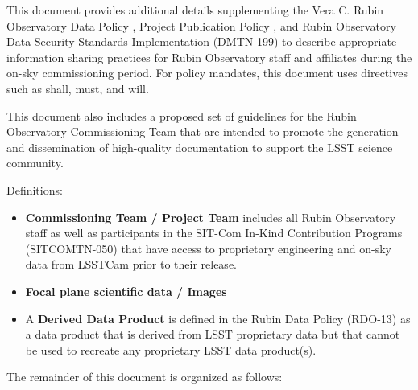 \documentclass[SE,authoryear,toc,lsstdraft]{lsstdoc}
\begin{document}
This document provides additional details supplementing the Vera C. Rubin Observatory Data Policy , Project Publication Policy , and Rubin Observatory Data Security Standards Implementation (DMTN-199) to describe appropriate information sharing practices for Rubin Observatory staff and affiliates during the on-sky commissioning period.
For policy mandates, this document uses directives such as shall, must, and will.

This document also includes a proposed set of guidelines for the Rubin Observatory Commissioning Team that are intended to promote the generation and dissemination of high-quality documentation to support the LSST science community.

Definitions:

\begin{itemize}

  \item \textbf{Commissioning Team / Project Team} includes all Rubin Observatory staff as well as participants in the SIT-Com In-Kind Contribution Programs (SITCOMTN-050) that have access to proprietary engineering and on-sky data from LSSTCam prior to their release.

  \item \textbf{Focal plane scientific data / Images}

  \item A \textbf{Derived Data Product} is defined in the Rubin Data Policy (RDO-13) as a data product that is derived from LSST proprietary data but that cannot be used to recreate any proprietary LSST data product(s).

\end{itemize}

The remainder of this document is organized as follows:
\end{document}
